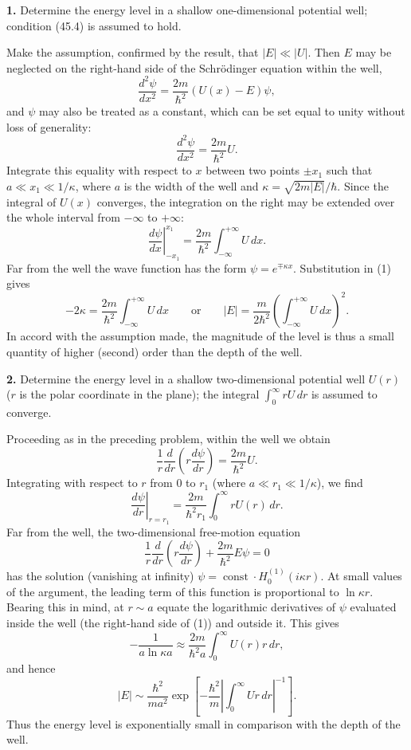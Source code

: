 \ProblemHeading
\textbf{1.} Determine the energy level in a shallow one-dimensional
potential well; condition (45.4) is assumed to hold.

\SolutionHeading Make the assumption, confirmed by the result,
that $|E|\ll|U|$. Then $E$ may be neglected on the right-hand side of the
Schrödinger equation within the well,
\[
  \frac{d^2\psi}{dx^2}=\frac{2m}{\hbar^2}(U(x)-E)\psi,
\]
and $\psi$ may also be treated as a constant, which can be set equal to unity
without loss of generality:
\[
  \frac{d^2\psi}{dx^2}=\frac{2m}{\hbar^2}U.
\]
Integrate this equality with respect to $x$ between two points $\pm x_1$ such
that $a\ll x_1\ll1/\kappa$, where $a$ is the width of the well and
$\kappa=\sqrt{2m|E|}/\hbar$. Since the integral of $U(x)$ converges, the
integration on the right may be extended over the whole interval from
$-\infty$ to $+\infty$:
\begin{equation}
  \left.\frac{d\psi}{dx}\right|_{-x_1}^{x_1}
  =\frac{2m}{\hbar^2}\int_{-\infty}^{+\infty}U\,dx.
  \tag{1}
\end{equation}
Far from the well the wave function has the form $\psi=e^{\mp\kappa x}$.
Substitution in (1) gives
\[
  -2\kappa=\frac{2m}{\hbar^2}\int_{-\infty}^{+\infty}U\,dx
  \qquad\text{or}\qquad
  |E|=\frac{m}{2\hbar^2}
  \left(\int_{-\infty}^{+\infty}U\,dx\right)^2.
\]
In accord with the assumption made, the magnitude of the level is thus a
small quantity of higher (second) order than the depth of the well.

\ProblemHeading
\textbf{2.} Determine the energy level in a shallow two-dimensional
potential well $U(r)$ ($r$ is the polar coordinate in the plane); the integral
$\int_0^\infty rU\,dr$ is assumed to converge.

\SolutionHeading Proceeding as in the preceding problem, within
the well we obtain
\[
  \frac1r\frac d{dr}\left(r\frac{d\psi}{dr}\right)
  =\frac{2m}{\hbar^2}U.
\]
Integrating with respect to $r$ from 0 to $r_1$ (where
$a\ll r_1\ll1/\kappa$), we find
\begin{equation}
  \left.\frac{d\psi}{dr}\right|_{r=r_1}
  =\frac{2m}{\hbar^2r_1}\int_0^\infty rU(r)\,dr.
  \tag{1}
\end{equation}
Far from the well, the two-dimensional free-motion equation
\[
  \frac1r\frac d{dr}\left(r\frac{d\psi}{dr}\right)
  +\frac{2m}{\hbar^2}E\psi=0
\]
has the solution (vanishing at infinity)
$\psi=\operatorname{const}\cdot H_0^{(1)}(i\kappa r)$. At small values of
the argument, the leading term of this function is proportional to
$\ln\kappa r$. Bearing this in mind, at $r\sim a$ equate the logarithmic
derivatives of $\psi$ evaluated inside the well (the right-hand side of (1))
and outside it. This gives
\[
  -\frac1{a\ln\kappa a}\approx
  \frac{2m}{\hbar^2a}\int_0^\infty U(r)r\,dr,
\]
and hence
\[
  |E|\sim\frac{\hbar^2}{ma^2}
  \exp\left[-\frac{\hbar^2}{m}
  \left|\int_0^\infty Ur\,dr\right|^{-1}\right].
\]
Thus the energy level is exponentially small in comparison with the depth of
the well.
